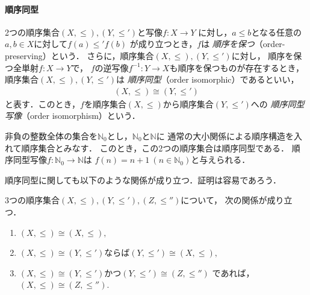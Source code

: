   \paragraph{順序同型}
   2つの順序集合$(X, {\leq}), (Y, {\leq'})$と写像$f:X \longrightarrow Y$
   に対し，$a \leq b$となる任意の$a,b \in X$に対して$f(a) \leq' f(b)$
   が成り立つとき，$f$は
   \emph{順序を保つ}（order-preserving）という．
   さらに，順序集合$(X, {\leq}),(Y, {\leq '})$に対し，
   順序を保つ全単射$f: X \longrightarrow Y$で，
   $f$の逆写像$f^{-1}:Y \longrightarrow X$も順序を保つものが存在するとき，
   順序集合$(X, {\leq}),(Y , {\leq'})$は
   \emph{順序同型}（order isomorphic）であるといい，
   \begin{align}
     (X , {\leq }) \cong (Y, {\leq'})
     \label{eq:orderiso}
   \end{align}
   と表す．このとき，$f$を順序集合$(X, {\leq })$から順序集合$(Y, {\leq'})$への
   \emph{順序同型写像}（order isomorphism）という．

   \begin{ex} \label{ex:orderiso}
     非負の整数全体の集合を$\mathbb{N}_0$とし，$\mathbb{N}_0$と$\mathbb{N}$に
     通常の大小関係による順序構造を入れて順序集合とみなす．
     このとき，この2つの順序集合は順序同型である．
     順序同型写像$f:\mathbb{N}_0 \longrightarrow \mathbb{N}$は
     $f(n) = n+1 \ (n \in \mathbb{N}_0)$と与えられる．
   \end{ex}

   順序同型に関しても以下のような関係が成り立つ．証明は容易であろう．
   
   \begin{thm} \label{thm:orderisodouti}
     3つの順序集合$(X, { \leq}),(Y, {\leq'}), (Z, {\leq''})$について，
     次の関係が成り立つ．
     \begin{enumerate}[(1) ]
       \item $(X,{\leq}) \cong (X, {\leq}),$
       \item $(X, {\leq}) \cong (Y, {\leq'})$ならば$(Y, {\leq'} ) \cong (X,{\leq}),$
       \item $(X, {\leq}) \cong (Y,{\leq'})$かつ$(Y,{\leq'}) \cong(Z, {\leq''})$
         であれば，$(X, {\leq}) \cong (Z, {\leq''}).$
     \end{enumerate}
   \end{thm}

